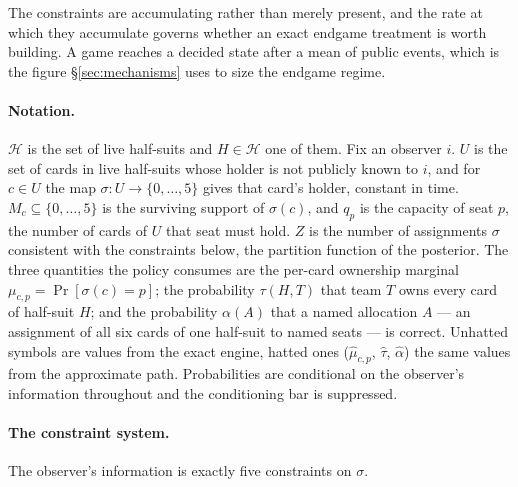 The constraints are accumulating rather than merely present, and the rate at
which they accumulate governs whether an exact endgame treatment is worth
building. A game reaches a decided state after a mean of \vsixCollapseEvents{}
public events, which is the figure \S\ref{sec:mechanisms} uses to size the
endgame regime.

\paragraph{Notation.} $\mathcal{H}$ is the set of live half-suits and $H \in
\mathcal{H}$ one of them. Fix an observer $i$. $U$ is the set of cards in live
half-suits whose holder is not publicly known to $i$, and for $c \in U$ the map
$\sigma : U \to \{0,\dots,5\}$ gives that card's holder, constant in time.
$M_c \subseteq \{0,\dots,5\}$ is the surviving support of $\sigma(c)$, and $q_p$
is the capacity of seat $p$, the number of cards of $U$ that seat must hold. $Z$
is the number of assignments $\sigma$ consistent with the constraints below, the
partition function of the posterior. The three quantities the policy consumes are
the per-card ownership marginal $\mu_{c,p} = \Pr[\sigma(c) = p]$; the probability
$\tau(H,T)$ that team $T$ owns every card of half-suit $H$; and the probability
$\alpha(A)$ that a named allocation $A$ --- an assignment of all six cards of one
half-suit to named seats --- is correct. Unhatted symbols are values from the
exact engine, hatted ones ($\hat\mu_{c,p}$, $\hat\tau$, $\hat\alpha$) the same
values from the approximate path. Probabilities are conditional on the observer's
information throughout and the conditioning bar is suppressed.

\paragraph{The constraint system.} The observer's information is exactly five
constraints on $\sigma$.

